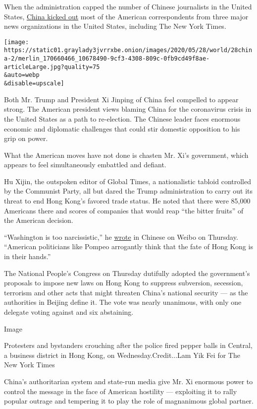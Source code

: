 When the administration capped the number of Chinese journalists in the
United States,
\href{https://www.nytimes3xbfgragh.onion/2020/03/17/business/media/china-expels-american-journalists.html}{China
kicked out} most of the American correspondents from three major news
organizations in the United States, including The New York Times.

\texttt{[image: https://static01.graylady3jvrrxbe.onion/images/2020/05/28/world/28china-2/merlin\_170660466\_10678490-9cf3-4308-809c-0fb9cd49f8ae-articleLarge.jpg?quality=75\\\&auto=webp\\\&disable=upscale]}

Both Mr. Trump and President Xi Jinping of China feel compelled to
appear strong. The American president views blaming China for the
coronavirus crisis in the United States as a path to re-election. The
Chinese leader faces enormous economic and diplomatic challenges that
could stir domestic opposition to his grip on power.

What the American moves have not done is chasten Mr. Xi's government,
which appears to feel simultaneously embattled and defiant.

Hu Xijin, the outspoken editor of Global Times, a nationalistic tabloid
controlled by the Communist Party, all but dared the Trump
administration to carry out its threat to end Hong Kong's favored trade
status. He noted that there were 85,000 Americans there and scores of
companies that would reap ``the bitter fruits'' of the American
decision.

``Washington is too narcissistic,'' he
\href{https://m.weibo.cn/status/4509393636362290?display=0\&retcode=6102}{wrote}
in Chinese on Weibo on Thursday. ``American politicians like Pompeo
arrogantly think that the fate of Hong Kong is in their hands.''

The National People's Congress on Thursday dutifully adopted the
government's proposals to impose new laws on Hong Kong to suppress
subversion, secession, terrorism and other acts that might threaten
China's national security --- as the authorities in Beijing define it.
The vote was nearly unanimous, with only one delegate voting against and
six abstaining.

Image

Protesters and bystanders crouching after the police fired pepper balls
in Central, a business district in Hong Kong, on Wednesday.Credit...Lam
Yik Fei for The New York Times

China's authoritarian system and state-run media give Mr. Xi enormous
power to control the message in the face of American hostility ---
exploiting it to rally popular outrage and tempering it to play the role
of magnanimous global partner.

